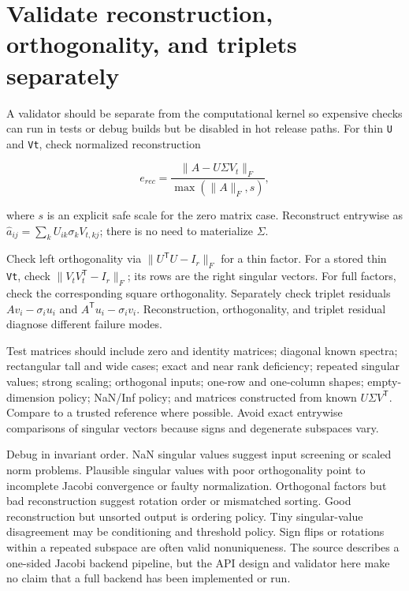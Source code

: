 \section{Validate reconstruction, orthogonality, and triplets separately}\label{02-foundations-ii-ch038-validate-reconstruction-orthogonality-and-triplets-separately}

A validator should be separate from the computational kernel so expensive checks can run in tests or debug builds but be disabled in hot release paths. For thin \texttt{U} and \texttt{Vt}, check normalized reconstruction

\[
e_{rec}=\frac{\|A-U\Sigma V_t\|_F}{\max(\|A\|_F,s)},
\]

where \(s\) is an explicit safe scale for the zero matrix case. Reconstruct entrywise as \(\hat a_{ij}=\sum_k U_{ik}\sigma_kV_{t,kj}\); there is no need to materialize \(\Sigma\).

Check left orthogonality via \(\|U^\mathsf TU-I_r\|_F\) for a thin factor. For a stored thin \texttt{Vt}, check \(\|V_tV_t^\mathsf T-I_r\|_F\); its rows are the right singular vectors. For full factors, check the corresponding square orthogonality. Separately check triplet residuals \(Av_i-\sigma_i u_i\) and \(A^\mathsf Tu_i-\sigma_i v_i\). Reconstruction, orthogonality, and triplet residual diagnose different failure modes.

Test matrices should include zero and identity matrices; diagonal known spectra; rectangular tall and wide cases; exact and near rank deficiency; repeated singular values; strong scaling; orthogonal inputs; one-row and one-column shapes; empty-dimension policy; NaN/Inf policy; and matrices constructed from known \(U\Sigma V^\mathsf T\). Compare to a trusted reference where possible. Avoid exact entrywise comparisons of singular vectors because signs and degenerate subspaces vary.

Debug in invariant order. NaN singular values suggest input screening or scaled norm problems. Plausible singular values with poor orthogonality point to incomplete Jacobi convergence or faulty normalization. Orthogonal factors but bad reconstruction suggest rotation order or mismatched sorting. Good reconstruction but unsorted output is ordering policy. Tiny singular-value disagreement may be conditioning and threshold policy. Sign flips or rotations within a repeated subspace are often valid nonuniqueness. The source describes a one-sided Jacobi backend pipeline, but the API design and validator here make no claim that a full backend has been implemented or run.

